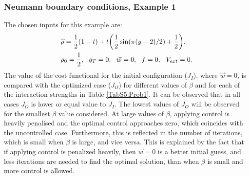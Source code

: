 \subsubsection{Neumann boundary conditions, Example 1}	 
The chosen inputs for this example are:
\begin{align*}
&\widehat \rho = \frac{1}{2}(1-t) + t\bigg(\frac{1}{2}\sin(\pi (y - 2)/2) + \frac{1}{2}\bigg),\\
&\rho_{0} = \frac{1}{2}, \ \
\adj_{T} = 0, \ \
\vec{w} = 0, \ \ 
f =0,\ \
V_{ext} =0.
\end{align*}	
The value of the cost functional for the initial configuration ($J_{I}$), where $\vec{w} =0$, is compared with the optimized case ($J_{O}$) for different values of $\beta$ and for each of the interaction strengths in Table \ref{TabS5:Prob1}. It can be observed that in all cases $J_{O}$ is lower or equal value to $J_{I}$. The lowest values of $J_{O}$ will be observed for the smallest $\beta$ value considered. At large values of $\beta$, applying control is heavily penalised and the optimal control approaches zero, which coincides with the uncontrolled case. Furthermore, this is reflected in the number of iterations, which is small when $\beta$ is large, and vice versa. This is explained by the fact that if applying control is penalized heavily, then $\vec{w} = 0$ is a better initial guess, and less iterations are needed to find the optimal solution, than when $\beta$ is small and more control is allowed.

